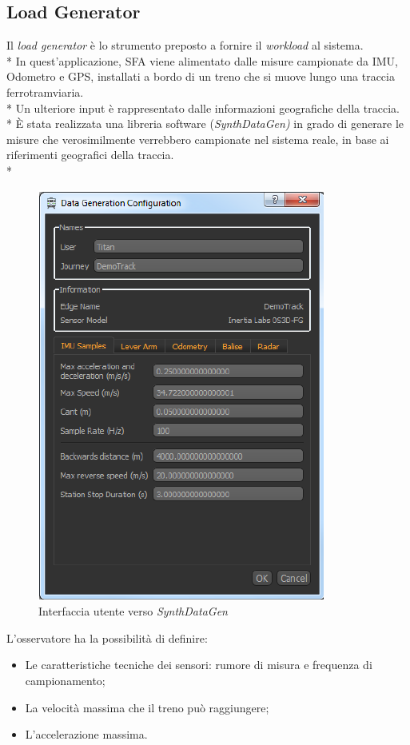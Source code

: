 \subsection{Load Generator}
Il \emph{load generator} \`e lo strumento preposto a fornire il \emph{workload} al sistema.\\*
In quest'applicazione, SFA viene alimentato dalle misure campionate da IMU, Odometro e GPS, installati a bordo di un treno che si muove lungo una traccia ferrotramviaria.\\*
Un ulteriore input \`e rappresentato dalle informazioni geografiche della traccia.\\*
\`E stata realizzata una libreria software (\emph{SynthDataGen)} in grado di generare le misure che verosimilmente verrebbero campionate nel sistema reale, in base ai riferimenti geografici della traccia.\\*
\begin{figure}[h]
	\centering
	\includegraphics[width=0.7\linewidth]{img/isdg}
	\caption{Interfaccia utente verso \emph{SynthDataGen}}
	\label{fig:datagenerationconfig}
\end{figure}
\FloatBarrier
L'osservatore ha la possibilit\`a di definire:
\begin{itemize}
	\item Le caratteristiche tecniche dei sensori: rumore di misura \cite{measnoise} e frequenza di campionamento;
	\item La velocit\`a massima che il treno pu\`o raggiungere;
	\item L'accelerazione massima.
\end{itemize}
